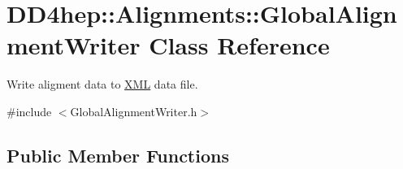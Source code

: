 \hypertarget{class_d_d4hep_1_1_alignments_1_1_global_alignment_writer}{}\section{D\+D4hep\+:\+:Alignments\+:\+:Global\+Alignment\+Writer Class Reference}
\label{class_d_d4hep_1_1_alignments_1_1_global_alignment_writer}


Write aligment data to \hyperlink{namespace_d_d4hep_1_1_x_m_l}{X\+ML} data file.  




{\ttfamily \#include $<$Global\+Alignment\+Writer.\+h$>$}

\subsection*{Public Member Functions}
